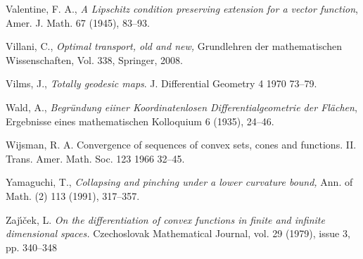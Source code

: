 \begin{thebibliography}{52}
 Valentine, F. A., 
\textit{A Lipschitz condition preserving extension for a vector
function}, Amer. J. Math. 67 (1945), 83--93.

 Villani, C., \textit{Optimal transport, old and new,} Grundlehren der mathematischen Wissenschaften, Vol. 338, Springer, 2008.

 Vilms, J., \textit{Totally geodesic maps}.
J. Differential Geometry 4 1970 73--79. 

 Wald, A., \textit{Begr\"undung eiiner Koordinatenlosen Differentialgeometrie der Fl\"achen}, Ergebnisse eines mathematischen Kolloquium
6  (1935), 24--46.



 Wijsman, R. A. Convergence of sequences of convex sets, cones and functions. II. Trans. Amer. Math. Soc. 123 1966 32--45.

 Yamaguchi, T., \textit{Collapsing and pinching under a lower curvature
bound,} Ann. of Math. (2) 113 (1991), 317--357.

 Zaj\'{\i}\v{c}ek, L. \textit{On the differentiation of convex functions in finite and infinite dimensional spaces.} Czechoslovak Mathematical Journal, vol. 29 (1979), issue 3, pp. 340--348
\end{thebibliography}
